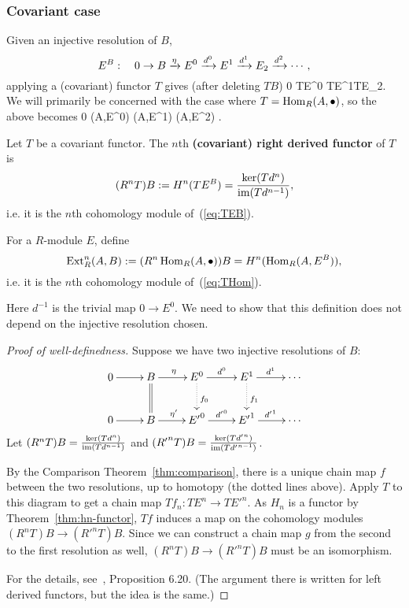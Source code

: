 \subsubsection{Covariant case}
Given an injective resolution of $B$,
\[
E^B:\quad
0\to B\xrightarrow{\eta} E^0 \xrightarrow{d^0} E^1\xrightarrow{d^1}E_2\xrightarrow{d^2}\cdots,
\]
applying a (covariant) functor $T$ gives (after deleting $TB$)
0\to %
TE^0  TE^1TE_2\cdots. 
\eeq
We will primarily be concerned with the case where $T=\operatorname{Hom}_R(A, \bullet)$, so the above becomes
0%
\to \Hom(A,E^0)  \Hom(A,E^1)
\Hom(A,E^2) \cdots. 
\eeq%
\begin{df}
Let $T$ be a covariant functor.
The $n$th \textbf{(covariant) right derived functor} of $T$ is
\[
(R^nT)B:=H^n(TE^B)=\frac{\ker(Td^n)}{\text{im}(Td^{n-1})},
\]
i.e. it is the $n$th cohomology module of~(\ref{eq:TEB}).

For a $R$-module $E$, define
\[
\operatorname{Ext}_R^n(A, B):=(R^n\operatorname{Hom}_R(A,\bullet))B=H^n(\operatorname{Hom}_R(A, E^B)),
\]
i.e. it is the $n$th cohomology module of~(\ref{eq:THom}).
\end{df}
Here $d^{-1}$ is the trivial map $0\to E^0$. 
We need to show that this definition does not depend on the injective resolution chosen.
\begin{proof}[Proof of well-definedness]
Suppose we have two injective resolutions of $B$:
\[
\xymatrix{
0\ar[r] & B \ar[r]^{\eta} \ar@{=}[d]& E^0 \ar[r]^{d^0}\ar@{.>}[d]^{f_0} & E^1\ar[r]^{d^1}\ar@{.>}[d]^{f_1}&\cdots\\
0\ar[r] & B \ar[r]^{\eta'} & {E'}^0 \ar[r]^{{d'}^0} & {E'}^1\ar[r]^{{d'}^1}&\cdots 
}
\]
Let $(R^nT)B=\frac{\ker(Td^n)}{\text{im}(Td^{n-1})}$ and $({R'}^nT)B=\frac{\ker(T{d'}^n)}{\text{im}(T{d'}^{n-1})}$. 

By the Comparison Theorem~\ref{thm:comparison}, there is a unique chain map $f$ between the two resolutions, up to homotopy (the dotted lines above). Apply $T$ to this diagram to get a chain map $Tf_n:TE^n\to T{E'}^n$. As $H_n$ is a functor by Theorem~\ref{thm:hn-functor}, $Tf$ induces a map on the cohomology modules $(R^nT)B\to ({R'}^nT)B$. Since we can construct a chain map $g$ from the second to the first resolution as well, $(R^nT)B\to ({R'}^nT)B$ must be an isomorphism.

For the details, see~\cite{Ro09}, Proposition 6.20. (The argument there is written for left derived functors, but the idea is the same.)
\end{proof}
